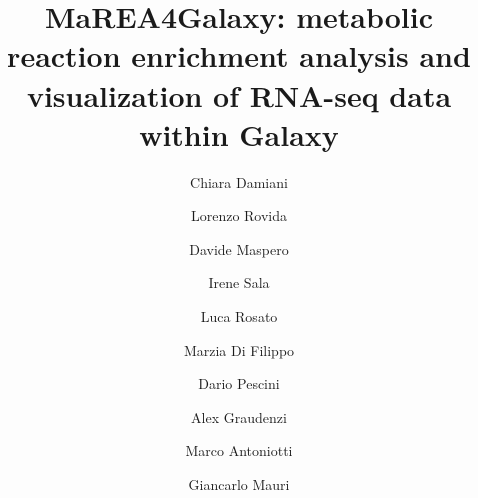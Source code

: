 \documentclass[preprint,12pt,authoryear]{elsarticle}
\newcommand{\mareagalaxy}{\textsf{MaREA4Galaxy}}
\begin{document}
\begin{frontmatter}


  
  
  
\title{\textsf{MaREA4Galaxy}: metabolic reaction enrichment analysis
  and visualization of RNA-seq data within Galaxy}


  \author[label3,label1,label2]{Chiara Damiani}
  \author[label1]{Lorenzo Rovida}
  \author[label1,label4]{Davide Maspero}
  \author[label1]{Irene Sala}
  \author[label1]{Luca Rosato}
  \author[label1]{Marzia Di Filippo}
  \author[label6,label2]{Dario Pescini}
  \author[label5]{Alex Graudenzi}
  \author[label1]{Marco Antoniotti}
  \author[label1,label2]{Giancarlo Mauri}

  \address[label3]{Dept. of Biotechnology and Biosciences,
    Univ. Milano-Bicocca, Milan, Italy}
  \address[label1]{Dept. of Informatics, Systems and Communication,
    Univ. of Milan-Bicocca, Milan, Italy}
  \address[label2]{SYSBIO Centre of Systems Biology, Univ. of
    Milano-Bicocca, Milan, Italy}
  \address[label4]{Fondazione IRCCS Istituto Nazionale dei Tumori,
    Milan, Italy}
  \address[label5]{Institute of Molecular Bioimaging and Physiology of
    the Italian National Research Council (IBFM-CNR), Segrate, Milan,
    Italy}
  \address[label6]{Department of Statistics and Quantitative methods,
    Univ. of Milan-Bicocca, Milan, Italy}






\end{frontmatter}
\end{document}
